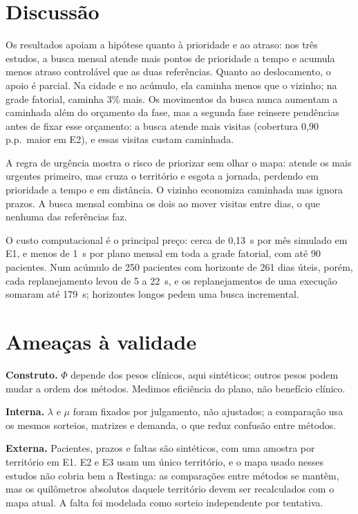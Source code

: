 \documentclass[conference,a4paper]{IEEEtran}
\newcommand{\pp}{\,p.p.}
\begin{document}
\section{Discussão}

Os resultados apoiam a hipótese quanto à prioridade e ao atraso: nos três estudos, a busca mensal atende mais pontos de prioridade a tempo e acumula menos atraso controlável que as duas referências. Quanto ao deslocamento, o apoio é parcial. Na cidade e no acúmulo, ela caminha menos que o vizinho; na grade fatorial, caminha 3\% mais. Os movimentos da busca nunca aumentam a caminhada além do orçamento da fase, mas a segunda fase reinsere pendências antes de fixar esse orçamento: a busca atende mais visitas (cobertura 0,90\pp\ maior em E2), e essas visitas custam caminhada.

A regra de urgência mostra o risco de priorizar sem olhar o mapa: atende os mais urgentes primeiro, mas cruza o território e esgota a jornada, perdendo em prioridade a tempo e em distância. O vizinho economiza caminhada mas ignora prazos. A busca mensal combina os dois ao mover visitas entre dias, o que nenhuma das referências faz.

O custo computacional é o principal preço: cerca de 0,13~s por mês simulado em E1, e menos de 1~s por plano mensal em toda a grade fatorial, com até 90 pacientes. Num acúmulo de 250 pacientes com horizonte de 261 dias úteis, porém, cada replanejamento levou de 5 a 22~s, e os replanejamentos de uma execução somaram até 179~s; horizontes longos pedem uma busca incremental.

\section{Ameaças à validade}

\textbf{Construto.} $\Phi$ depende dos pesos clínicos, aqui sintéticos; outros pesos podem mudar a ordem dos métodos. Medimos eficiência do plano, não benefício clínico.

\textbf{Interna.} $\lambda$ e $\mu$ foram fixados por julgamento, não ajustados; a comparação usa os mesmos sorteios, matrizes e demanda, o que reduz confusão entre métodos.

\textbf{Externa.} Pacientes, prazos e faltas são sintéticos, com uma amostra por território em E1. E2 e E3 usam um único território, e o mapa usado nesses estudos não cobria bem a Restinga: as comparações entre métodos se mantêm, mas os quilômetros absolutos daquele território devem ser recalculados com o mapa atual. A falta foi modelada como sorteio independente por tentativa.
\end{document}

